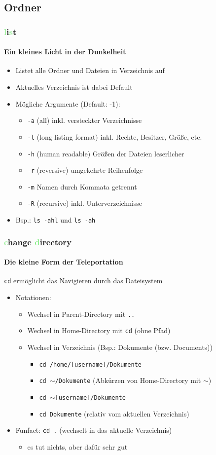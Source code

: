 \documentclass[12pt,utf8]{beamer}
\begin{document}
\subsection{Ordner}
\begin{frame}
\frametitle{\textcolor{lightGreen}{l}i\textcolor{lightGreen}{s}t}
\framesubtitle{Ein kleines Licht in der Dunkelheit}
\begin{itemize}
	\item Listet alle Ordner und Dateien in Verzeichnis auf
	\item Aktuelles Verzeichnis ist dabei Default
	\item Mögliche Argumente (Default: -1):
	\begin{itemize}[<+->]
		\item \texttt{-a}  (all) inkl. versteckter Verzeichnisse
		\item \texttt{-l}  (long listing format) inkl. Rechte, Besitzer, Größe, etc.
		\item \texttt{-h}  (human readable) Größen der Dateien leserlicher
		\item \texttt{-r}  (reversive) umgekehrte Reihenfolge
		\item \texttt{-m}  Namen durch Kommata getrennt
		\item \texttt{-R}  (recursive) inkl. Unterverzeichnisse
	\end{itemize}
	\item Bsp.: \texttt{ls -ahl} und \texttt{ls -ah}
\end{itemize}
\end{frame}

\begin{frame}
\frametitle{\textcolor{lightGreen}{c}hange \textcolor{lightGreen}{d}irectory}
\framesubtitle{Die kleine Form der Teleportation}
\texttt{cd} ermöglicht das Navigieren durch das Dateisystem
\begin{itemize}
	\item Notationen:	
	\begin{itemize}[<+->]
		\item Wechsel in Parent-Directory mit \texttt{..}
		\item Wechsel in Home-Directory mit \texttt{cd}   (ohne Pfad)
		\item Wechsel in Verzeichnis (Bsp.: Dokumente (bzw. Documents))
		\begin{itemize}[<+->]
			\item \texttt{cd /home/[username]/Dokumente}
			\item \texttt{cd $\sim$/Dokumente}   (Abkürzen von Home-Directory mit $\sim$)
			\item \texttt{cd $\sim$[username]/Dokumente}
			\item \texttt{cd Dokumente}    (relativ vom aktuellen Verzeichnis)
		\end{itemize}
	\end{itemize}
	\item Funfact: \texttt{cd .}  (wechselt in das aktuelle Verzeichnis)
	\begin{itemize}
		\item es tut nichts, aber dafür sehr gut
	\end{itemize}
\end{itemize}
\end{frame}
\end{document}
